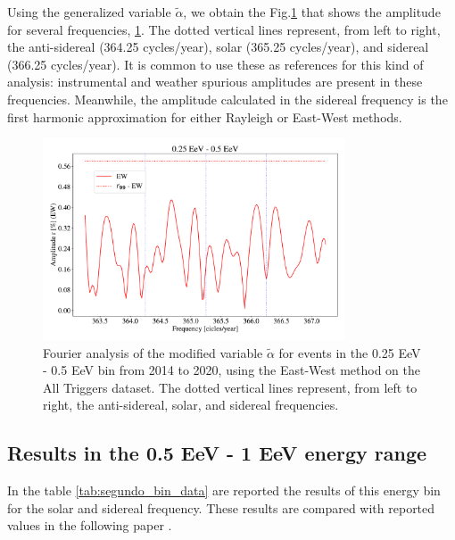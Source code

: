 \documentclass[12pt, doublespace, oneside]{article}
\begin{document}
Using the generalized variable $\tilde{\alpha}$, we obtain the Fig.\ref{fig:primer_barrido} that shows the amplitude for several frequencies, \ref{fig:primer_barrido}.  The dotted vertical lines represent, from left to right,  the anti-sidereal (364.25 cycles/year), solar (365.25 cycles/year), and sidereal (366.25 cycles/year). It is common to use these as references for this kind of analysis: instrumental and weather spurious amplitudes are present in these frequencies. Meanwhile, the amplitude calculated in the sidereal frequency is the first harmonic approximation for either Rayleigh or East-West methods. 


\begin{figure}[H]
    \begin{small}
        \begin{center}
            \vspace*{-1.2 cm}
            \includegraphics[width=0.8\textwidth]{Figs/plot_bin_1_barrido_v3_EW.pdf}
            \vspace*{-0.8 cm}
        \end{center}
        \caption{Fourier analysis of the modified variable $\tilde{\alpha}$ for events in the 0.25 EeV - 0.5 EeV bin from 2014 to 2020, using the East-West method on the All Triggers dataset. The dotted vertical lines represent, from left to right, the anti-sidereal, solar, and sidereal frequencies.}
        \label{fig:primer_barrido}
    \end{small}
\end{figure}

\subsection{Results in the 0.5 EeV - 1 EeV energy range}


In the table \ref{tab:segundo_bin_data} are reported the results of this energy bin for the solar and sidereal frequency. These results are compared with reported values in the following paper \cite{Aab_2020}. 
\end{document}
